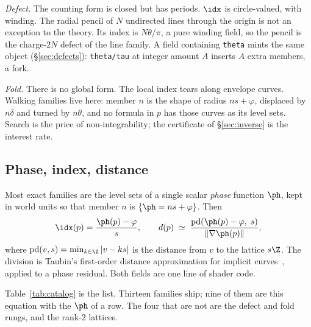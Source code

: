 \emph{Defect.} The counting form is closed but has periods. $\idx$ is
circle-valued, with winding. The radial pencil of $N$ undirected lines
through the origin is not an exception to the theory. Its index is
$N\theta/\pi$, a pure winding field, so the pencil is the charge-$2N$
defect of the line family. A field containing \texttt{theta} mints the
same object (\S\ref{sec:defects}): \texttt{theta/tau} at integer
amount $A$ inserts $A$ extra members, a fork.

\emph{Fold.} There is no global form. The local index tears along
envelope curves. Walking families live here: member $n$ is the shape of
radius $ns+\varphi$, displaced by $n\delta$ and turned by $n\theta$,
and no formula in $p$ has those curves as its level sets. Search is
the price of non-integrability; the certificate of
\S\ref{sec:inverse} is the interest rate.

\subsection{Phase, index, distance}

Most exact families are the level sets of a single scalar \emph{phase}
function $\ph$, kept in world units so that member $n$ is
$\{\ph=ns+\varphi\}$. Then
\begin{equation}
  \idx(p) = \frac{\ph(p)-\varphi}{s},
  \qquad
  d(p) \;\simeq\; \frac{\mathrm{pd}\!\left(\ph(p)-\varphi,\; s\right)}{\lVert\nabla\ph(p)\rVert},
  \label{eq:eikonal}
\end{equation}
where $\mathrm{pd}(v,s)=\min_{k\in\Z}|v-ks|$ is the distance from $v$
to the lattice $s\Z$. The division is Taubin's first-order distance
approximation for implicit curves~\cite{Taubin1994Distance}, applied
to a phase residual. Both fields are one line of shader code.

Table~\ref{tab:catalog} is the list. Thirteen families ship; nine of
them are this equation with the $\ph$ of a row. The four that are not
are the defect and fold rungs, and the rank-$2$ lattices.

